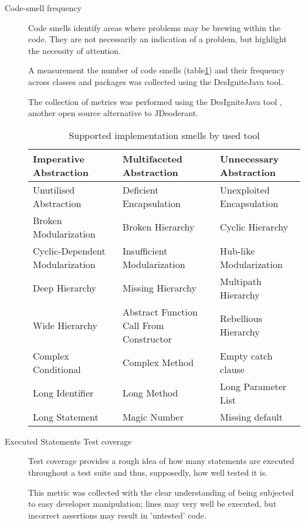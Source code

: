 \begin{description}
	\item [Code-smell frequency] Code smells identify areas where problems may be brewing within the code. They are not necessarily an indication of a problem, but highlight the necessity of attention. \parencite[chapter~3]{fowler1999refactoring}
	
	A measurement the number of code smells (table\ref{tab:supportedCodeSmells}) and their frequency across classes and packages was collected using the DesIgniteJava tool.
	
	The collection of metrics was performed using the DesIgniteJava tool \parencite{designiteToolGitHub}, another open source alternative to JDeoderant.
	
	\begin{table}[H]
		\begin{tabular}{ | l | l | l |}
			\hline
			Imperative Abstraction & Multifaceted Abstraction & Unnecessary Abstraction \\
			\hline
			Unutilised Abstraction & Deficient Encapsulation & Unexploited Encapsulation \\
			\hline
			Broken Modularization & Broken Hierarchy & Cyclic Hierarchy \\
			\hline
			Cyclic-Dependent Modularization & Insufficient Modularization & Hub-like Modularization \\
			\hline
			Deep Hierarchy & Missing Hierarchy & Multipath Hierarchy \\ 
			\hline
			Wide Hierarchy & Abstract Function Call From Constructor & Rebellious Hierarchy \\
			\hline
			Complex Conditional & Complex Method & Empty catch clause \\
			\hline
			Long Identifier & Long Method & Long Parameter List \\
			\hline
			Long Statement & Magic Number & Missing default \\
			\hline
		\end{tabular}
		\caption{Supported implementation smells by used tool}
		\label{tab:supportedCodeSmells}
	\end{table}
	
	\item [Executed Statements Test coverage] Test coverage provides a rough idea of how many statements are executed throughout a test suite and thus, supposedly, how well tested it is.
	
	This metric was collected with the clear understanding of being subjected to easy developer manipulation; lines may very well be executed, but incorrect assertions may result in 'untested' code.
	

\end{description}
